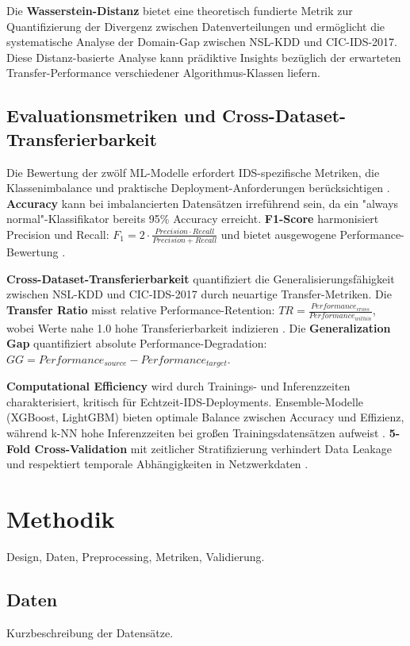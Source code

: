 \documentclass[11pt,a4paper]{article}
\begin{document}
    Die \textbf{Wasserstein-Distanz} bietet eine theoretisch fundierte Metrik zur Quantifizierung der Divergenz zwischen Datenverteilungen und ermöglicht die systematische Analyse der Domain-Gap zwischen NSL-KDD und CIC-IDS-2017. Diese Distanz-basierte Analyse kann prädiktive Insights bezüglich der erwarteten Transfer-Performance verschiedener Algorithmus-Klassen liefern.

    \subsection{Evaluationsmetriken und Cross-Dataset-Transferierbarkeit}

    Die Bewertung der zwölf ML-Modelle erfordert IDS-spezifische Metriken, die Klassenimbalance und praktische Deployment-Anforderungen berücksichtigen \parencite{Belavagi2016}. \textbf{Accuracy} kann bei imbalancierten Datensätzen irreführend sein, da ein "always normal"-Klassifikator bereits 95\% Accuracy erreicht. \textbf{F1-Score} harmonisiert Precision und Recall: $F_1 = 2 \cdot \frac{Precision \cdot Recall}{Precision + Recall}$ und bietet ausgewogene Performance-Bewertung \parencite{Hastie2009}.

    \textbf{Cross-Dataset-Transferierbarkeit} quantifiziert die Generalisierungsfähigkeit zwischen NSL-KDD und CIC-IDS-2017 durch neuartige Transfer-Metriken. Die \textbf{Transfer Ratio} misst relative Performance-Retention: $TR = \frac{Performance_{cross}}{Performance_{within}}$, wobei Werte nahe 1.0 hohe Transferierbarkeit indizieren \parencite{Mourouzis2021}. Die \textbf{Generalization Gap} quantifiziert absolute Performance-Degradation: $GG = Performance_{source} - Performance_{target}$.

    \textbf{Computational Efficiency} wird durch Trainings- und Inferenzzeiten charakterisiert, kritisch für Echtzeit-IDS-Deployments. Ensemble-Modelle (XGBoost, LightGBM) bieten optimale Balance zwischen Accuracy und Effizienz, während k-NN hohe Inferenzzeiten bei großen Trainingsdatensätzen aufweist \parencite{Vinayakumar2019}. \textbf{5-Fold Cross-Validation} mit zeitlicher Stratifizierung verhindert Data Leakage und respektiert temporale Abhängigkeiten in Netzwerkdaten \parencite{Tavallaee2009}.

    \section{Methodik}
    Design, Daten, Preprocessing, Metriken, Validierung.
    \subsection{Daten}
    Kurzbeschreibung der Datensätze.
\end{document}
